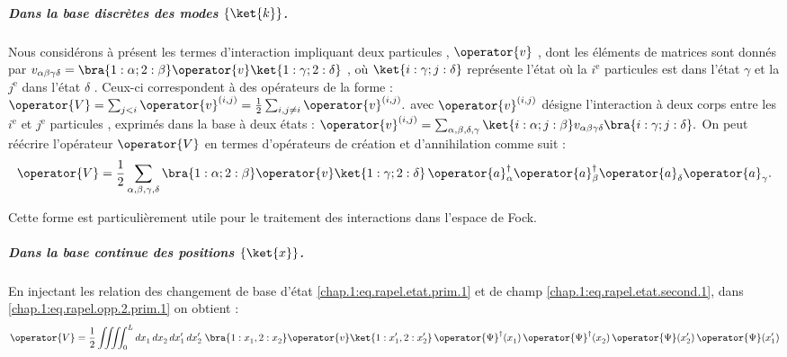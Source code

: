 \subparagraph{Dans la base discrètes des modes \( \{ \ket{k} \} \).}

Nous considérons à présent les termes d’interaction impliquant deux particules , $\operator{v}$ , dont les éléments de matrices sont donnés par $v_{\alpha \beta \gamma \delta} = \bra{ 1 : \alpha; 2 : \beta } \operator{v}\ket{ 1 : \gamma; 2 : \delta }$ , où $\ket{ i : \gamma; j : \delta }$ représente l'état où la $i^\text{e}$  particules est dans l'état $\gamma$ et la $j^\text{e}$ dans l'état $\delta$  . Ceux-ci correspondent à des opérateurs de la forme :
\(
    \operator{V} = \sum_{j < i} \operator{v}^{(i, j)} = \frac{1}{2} \sum_{i, j \ne i} \operator{v}^{(i, j)}
    \label{eq:V2corps}.
\)
avec $\operator{v}^{(i, j)}$ désigne l’interaction à deux corps entre les $i^\text{e}$ et $j^\text{e}$ particules , exprimés dans la base à deux états :
\(
	\operator{v}^{(i, j)} = \sum_{\alpha,\beta,\delta,\gamma} \ket{i : \alpha; j : \beta }v_{\alpha \beta \gamma \delta} \bra{ i : \gamma; j : \delta }.
    \label{eq:matriceV}
\)
On peut réécrire l’opérateur \( \operator{V} \) en termes d’opérateurs de création et d’annihilation comme suit :
\begin{equation}
    \operator{V} = \frac{1}{2} \sum_{\alpha, \beta, \gamma, \delta} \bra{ 1 : \alpha; 2 : \beta } \operator{v}\ket{ 1 : \gamma; 2 : \delta } \, \operator{a}^\dagger_\alpha \operator{a}^\dagger_\beta \operator{a}_\delta^{} \operator{a}_\gamma^{}.
    \label{chap.1:eq.rapel.opp.2.prim.1}
\end{equation}

Cette forme est particulièrement utile pour le traitement des interactions dans l’espace de Fock.

\subparagraph{Dans la base continue des positions \( \{ \ket{x} \} \).}

En injectant les relation des changement de base d'état
\eqref{chap.1:eq.rapel.etat.prim.1} et de champ \eqref{chap.1:eq.rapel.etat.second.1}, dans \eqref{chap.1:eq.rapel.opp.2.prim.1} on obtient :
\begin{equation}
    \operator{V} = \frac{1}{2} \iiiint_0^L dx_1^{} \, dx_2^{} \, dx_1' \, dx_2' \; 
    \bra{ 1 : x_1^{}, 2 : x_2^{} } \operator{v} \ket{ 1 : x_1', 2 : x_2' } \,
    \operator{\Psi}^\dagger(x_1^{}) \, \operator{\Psi}^\dagger(x_2^{}) \, 
    \operator{\Psi}(x_2') \, \operator{\Psi}(x_1')
    \label{chap.1:eq.rapel.opp.2.second.1}
\end{equation}

